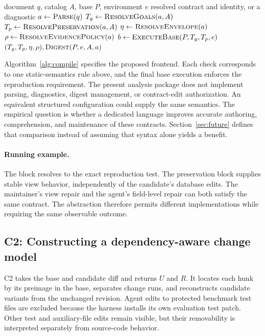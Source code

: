 \documentclass[a4paper,fleqn]{cas-sc}
\newcommand{\code}[1]{\texttt{\detokenize{#1}}}
\begin{document}
\begin{algorithm}[tbp]
\caption{Proposed contract compilation and preparation (C1)}\label{alg:compile}
\begin{algorithmic}[1]
\Require document $q$, catalog $A$, base $P$, environment $e$
\Ensure resolved contract and identity, or a diagnostic
\State $a\gets\Call{Parse}{q}$
\State {}
\State $T_g\gets\Call{ResolveGoals}{a,A}$
\State $T_p\gets\Call{ResolvePreservation}{a,A}$
\State {}
\State $\eta\gets\Call{ResolveEnvelope}{a}$
\State $\rho\gets\Call{ResolveEvidencePolicy}{a}$
\State {}
\State $b\gets\Call{ExecuteBase}{P,T_g,T_p,e}$
  \State \Return {}
\EndIf
\State \Return $(T_g,T_p,\eta,\rho),\Call{Digest}{P,e,A,a}$
\end{algorithmic}
\end{algorithm}

Algorithm~\ref{alg:compile} specifies the proposed frontend. Each check corresponds to one static-semantics rule above, and the final base execution enforces the reproduction requirement. The present analysis package does not implement parsing, diagnostics, digest management, or contract-edit authorization. An equivalent structured configuration could supply the same semantics. The empirical question is whether a dedicated language improves accurate authoring, comprehension, and maintenance of these contracts. Section~\ref{sec:future} defines that comparison instead of assuming that syntax alone yields a benefit.

\paragraph{Running example.}
The \code{url_parameter} block resolves to the exact reproduction test. The preservation block supplies stable view behavior, independently of the candidate's database edits. The maintainer's view repair and the agent's field-level repair can both satisfy the same contract. The abstraction therefore permits different implementations while requiring the same observable outcome.

\subsection{C2: Constructing a dependency-aware change model}\label{sec:decomposition}

C2 takes the base and candidate diff and returns $U$ and $R$. It locates each hunk by its preimage in the base, separates change runs, and reconstructs candidate variants from the unchanged revision. Agent edits to protected benchmark test files are excluded because the harness installs its own evaluation test patch. Other test and auxiliary-file edits remain visible, but their removability is interpreted separately from source-code behavior.
\end{document}
